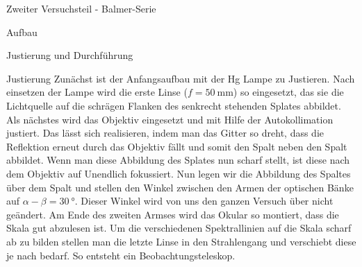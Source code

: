 \documentclass[pdftex, a4paper,11pt, twoside, ngerman]{report}
\begin{document}
\begin{chapter}{Zweiter Versuchsteil - Balmer-Serie}
\begin{section}{Aufbau}
    \end{section}
   
   
   
    \begin{section}{Justierung und Durchführung}
      \label{chp:Balmer:sec:JusitierungDurchfuehrung}
     
     
     
      \begin{subsection}{Justierung}
        \label{chp:Balmer:sec:JusitierungDurchfuehrung:subsec:Justierung}
        Zunächst ist der Anfangsaufbau mit der Hg Lampe zu Justieren. Nach
        einsetzen der Lampe wird die erste Linse ($f=\SI{50}{\milli\meter}$)
        so eingesetzt, das sie die Lichtquelle auf die schrägen Flanken des
        senkrecht stehenden Splates abbildet. Als nächstes wird das Objektiv
        eingesetzt und mit Hilfe der Autokollimation justiert. Das lässt sich
        realisieren, indem man das Gitter so dreht, dass die Reflektion erneut
        durch das Objektiv fällt und somit den Spalt neben den Spalt abbildet.
        Wenn man diese Abbildung des Splates nun scharf stellt, ist diese nach
        dem Objektiv auf Unendlich fokussiert. Nun legen wir die Abbildung des
        Spaltes über dem Spalt und stellen den Winkel zwischen den Armen der
        optischen Bänke auf $\alpha-\beta = \SI{30}{\degree}$. Dieser Winkel
        wird von uns den ganzen Versuch über nicht geändert. Am Ende des
        zweiten Armses wird das Okular so montiert, dass die Skala gut
        abzulesen ist. Um die verschiedenen Spektrallinien auf die Skala
        scharf ab zu bilden stellen man die letzte Linse in den Strahlengang
        und verschiebt diese je nach bedarf. So entsteht ein
        Beobachtungsteleskop.

      \end{subsection}
     
     
     

\end{section}
\end{chapter}
\end{document}
